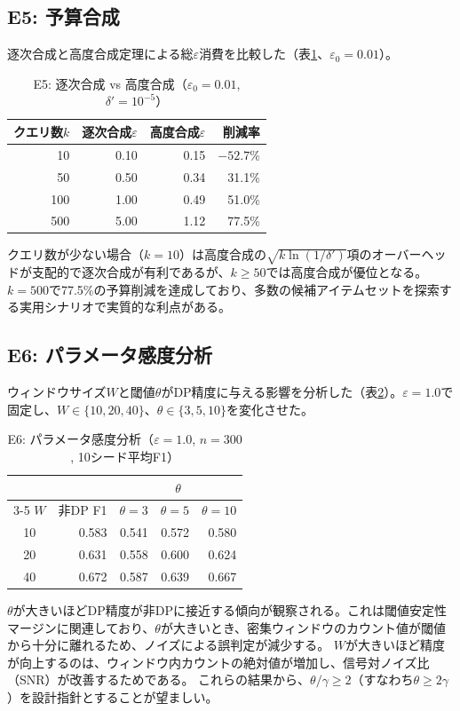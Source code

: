 \subsection{E5: 予算合成}

逐次合成と高度合成定理による総$\varepsilon$消費を比較した（表\ref{tab:e5}、$\varepsilon_0 = 0.01$）。

\begin{table}[t]
\centering
\caption{E5: 逐次合成 vs 高度合成（$\varepsilon_0 = 0.01$, $\delta' = 10^{-5}$）}
\label{tab:e5}
\begin{tabular}{rrrr}
\toprule
クエリ数$k$ & 逐次合成$\varepsilon$ & 高度合成$\varepsilon$ & 削減率 \\
\midrule
10  & 0.10 & 0.15 & $-52.7$\% \\
50  & 0.50 & 0.34 & 31.1\% \\
100 & 1.00 & 0.49 & 51.0\% \\
500 & 5.00 & 1.12 & 77.5\% \\
\bottomrule
\end{tabular}
\end{table}

クエリ数が少ない場合（$k = 10$）は高度合成の$\sqrt{k\ln(1/\delta')}$項のオーバーヘッドが支配的で逐次合成が有利であるが、$k \geq 50$では高度合成が優位となる。
$k = 500$で77.5\%の予算削減を達成しており、多数の候補アイテムセットを探索する実用シナリオで実質的な利点がある。

\subsection{E6: パラメータ感度分析}

ウィンドウサイズ$W$と閾値$\theta$がDP精度に与える影響を分析した（表\ref{tab:e6}）。$\varepsilon = 1.0$で固定し、$W \in \{10, 20, 40\}$、$\theta \in \{3, 5, 10\}$を変化させた。

\begin{table}[t]
\centering
\caption{E6: パラメータ感度分析（$\varepsilon = 1.0$, $n = 300$, 10シード平均F1）}
\label{tab:e6}
\begin{tabular}{crrrr}
\toprule
& & \multicolumn{3}{c}{$\theta$} \\
\cmidrule(lr){3-5}
$W$ & 非DP F1 & $\theta = 3$ & $\theta = 5$ & $\theta = 10$ \\
\midrule
10  & 0.583 & 0.541 & 0.572 & 0.580 \\
20  & 0.631 & 0.558 & 0.600 & 0.624 \\
40  & 0.672 & 0.587 & 0.639 & 0.667 \\
\bottomrule
\end{tabular}
\end{table}

$\theta$が大きいほどDP精度が非DPに接近する傾向が観察される。これは閾値安定性マージンに関連しており、$\theta$が大きいとき、密集ウィンドウのカウント値が閾値から十分に離れるため、ノイズによる誤判定が減少する。
$W$が大きいほど精度が向上するのは、ウィンドウ内カウントの絶対値が増加し、信号対ノイズ比（SNR）が改善するためである。
これらの結果から、$\theta / \gamma \geq 2$（すなわち$\theta \geq 2\gamma$）を設計指針とすることが望ましい。

